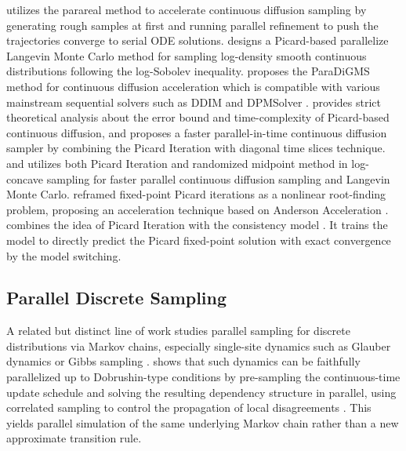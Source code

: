 \documentclass{article}
\begin{document}
\citep{selvam2024self} utilizes the parareal method to accelerate continuous diffusion sampling by generating rough samples at first and running parallel refinement to push the trajectories converge to serial ODE solutions. \citep{anari2024fast} designs a Picard-based parallelize Langevin Monte Carlo method for sampling log-density smooth continuous distributions following the log-Sobolev inequality. \citep{shih2023parallel} proposes the ParaDiGMS method for continuous diffusion acceleration which is compatible with various mainstream sequential solvers such as DDIM \citep{song2020denoising} and DPMSolver \citep{lu2022dpm}. \citep{chen2024accelerating} provides strict theoretical analysis about the error bound and time-complexity of Picard-based continuous diffusion, and \citep{zhouparallel} proposes a faster parallel-in-time continuous diffusion sampler by combining the Picard Iteration with diagonal time slices technique. \citep{gupta2024faster} and \citep{yu2025parallelized} utilizes both Picard Iteration and randomized midpoint method in log-concave sampling \citep{shen2019randomized} for faster parallel continuous diffusion sampling and Langevin Monte Carlo. \citep{tang2024accelerating} reframed fixed-point Picard iterations as a nonlinear root-finding problem, proposing an acceleration technique based on Anderson Acceleration \citep{anderson1965iterative}. \citep{so2025pcm} combines the idea of Picard Iteration with the consistency model \citep{song2023consistency}. It trains the model to directly predict the Picard fixed-point solution with exact convergence by the model switching.


\subsection{Parallel Discrete Sampling}
A related but distinct line of work studies parallel sampling for discrete distributions via Markov chains, especially single-site dynamics such as Glauber dynamics or Gibbs sampling \citep{glauber1963time}. \citep{liu2025parallelize} shows that such dynamics can be faithfully parallelized up to Dobrushin-type conditions by
pre-sampling the continuous-time update schedule and solving the resulting dependency structure in parallel, using correlated sampling to control the propagation of local disagreements \citep{kleinberg2002approximation, holenstein2007parallel, bavarian2020optimality}. This yields parallel simulation of the same underlying Markov chain rather than a new approximate transition rule.
\end{document}
